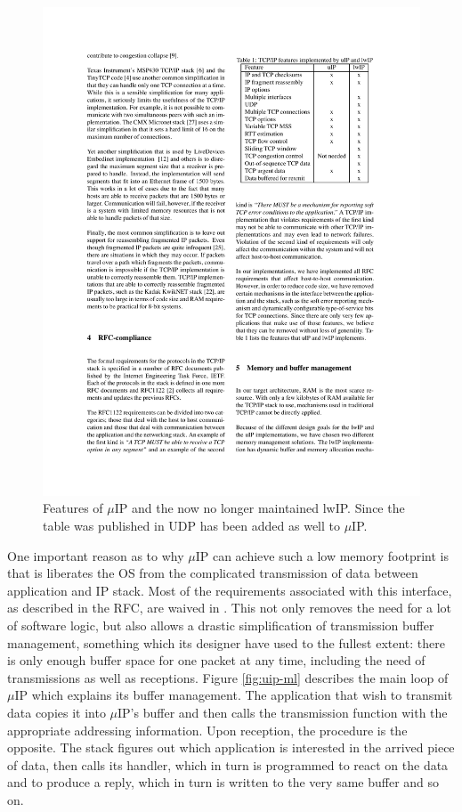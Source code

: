 \documentclass[final,a4paper,twoside,11pt,onecolumn]{report}
\begin{document}
\begin{figure}
\begin{minipage}{.5\textwidth}
      \includegraphics[width=.9\linewidth]{dunkels-uip-and-lwip}
      \caption{Features of $\mu$IP and the now no longer maintained lwIP. Since the table was published in \citep[p.4]{dunkels2003full} UDP has been added as well to $\mu$IP.}
      \label{fig:uip-features}
   \end{minipage}
\end{figure}

One important reason as to why $\mu$IP can achieve such a low memory footprint is that is liberates the OS from the complicated transmission of data between application and IP stack. Most of the requirements associated with this interface, as described in the RFC, are waived in \citep[p.4]{dunkels2003full}. This not only removes the need for a lot of software logic, but also allows a drastic simplification of transmission buffer management, something which its designer have used to the fullest extent: there is only enough buffer space for one packet at any time, including the need of transmissions as well as receptions. Figure \ref{fig:uip-ml} describes the main loop of $\mu$IP which explains its buffer management. The application that wish to transmit data copies it into $\mu$IP's buffer and then calls the transmission function with the appropriate addressing information. Upon reception, the procedure is the opposite. The stack figures out which application is interested in the arrived piece of data, then calls its handler, which in turn is programmed to react on the data and to produce a reply, which in turn is written to the very same buffer and so on.
\end{document}
